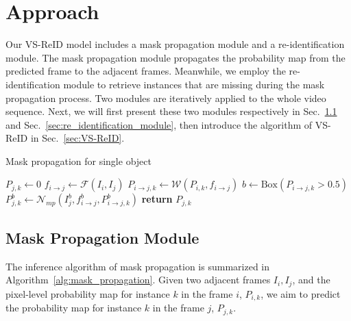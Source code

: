 \section{Approach}
%
Our VS-ReID model includes a mask propagation module and a re-identification module.
%
The mask propagation module propagates the probability map from the predicted frame to the adjacent frames.
%
Meanwhile, we employ the re-identification module to retrieve instances that are missing during the mask propagation process.
%
Two modules are iteratively applied to the whole video sequence.
%
Next, we will first present these two modules respectively in Sec.~\ref{sec:mask_propagation_module} and Sec.~\ref{sec:re_identification_module}, then introduce the algorithm of VS-ReID in Sec.~\ref{sec:VS-ReID}.


\begin{algorithm}
	\caption{Mask propagation for single object}   
	\label{alg:mask_propagation}
	\begin{algorithmic}[1]
		\small
		\State $P_{j,k} \gets 0$ 
		\State $f_{i \to j} \gets \mathcal{F}(I_i, I_j)$ 
		\State $P_{i \to j, k} \gets \mathcal{W}(P_{i, k}, f_{i \to j})$ 
		\State $b \gets \mathrm{Box}(P_{i \to j, k} > 0.5)$ 
		\State $P_{j, k}^b \gets \mathcal{N}_{mp}(I_{j}^b, f_{i \to j}^b, P_{i \to j, k}^b)$
		\State \textbf{return} $P_{j, k}$
		\EndProcedure
	\end{algorithmic}  
\end{algorithm}  


\subsection{Mask Propagation Module}
\label{sec:mask_propagation_module}
The inference algorithm of mask propagation is summarized in Algorithm~\ref{alg:mask_propagation}. 
%
Given two adjacent frames $I_i, I_j$, and the pixel-level probability map for instance $k$ in the frame $i$, $P_{i,k}$, we aim to predict the probability map for instance $k$ in the frame $j$, $P_{j,k}$.

